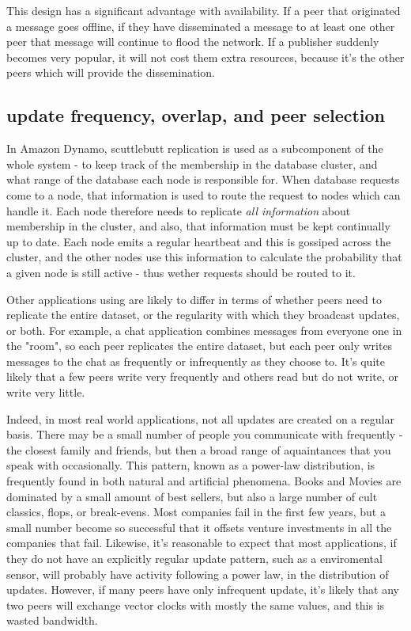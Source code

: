 \documentclass[sigconf]{acmart}
\begin{document}
This design has a significant advantage with availability.  If a peer
that originated a message goes offline, if they have disseminated a
message to at least one other peer that message will continue to flood
the network. If a publisher suddenly becomes very popular, it will not
cost them extra resources, because it's the other peers which will
provide the dissemination.

\subsection{update frequency, overlap, and peer selection}

In Amazon Dynamo, scuttlebutt replication is used as a subcomponent of
the whole system - to keep track of the membership in the database
cluster, and what range of the database each node is responsible
for. When database requests come to a node, that information is used
to route the request to nodes which can handle it. Each node therefore
needs to replicate {\em all information} about membership in the
cluster, and also, that information must be kept continually up to
date. Each node emits a regular heartbeat and this is gossiped across
the cluster, and the other nodes use this information to calculate the
probability that a given node is still active - thus wether requests
should be routed to it.

Other applications using are likely to differ in terms of whether
peers need to replicate the entire dataset, or the regularity with
which they broadcast updates, or both. For example, a chat application
combines messages from everyone one in the "room", so each peer
replicates the entire dataset, but each peer only writes messages to
the chat as frequently or infrequently as they choose to. It's quite
likely that a few peers write very frequently and others read but do
not write, or write very little.

Indeed, in most real world applications, not all updates are created
on a regular basis. There may be a small number of people you
communicate with frequently - the closest family and friends, but then
a broad range of aquaintances that you speak with occasionally. This
pattern, known as a power-law distribution, is frequently found in
both natural and artificial phenomena.  Books and Movies are dominated
by a small amount of best sellers, but also a large number of cult
classics, flops, or break-evens.  Most companies fail in the first few
years, but a small number become so successful that it offsets venture
investments in all the companies that fail. Likewise, it's reasonable
to expect that most applications, if they do not have an explicitly
regular update pattern, such as a enviromental sensor, will probably
have activity following a power law, in the distribution of
updates. However, if many peers have only infrequent update, it's
likely that any two peers will exchange vector clocks with mostly the
same values, and this is wasted bandwidth.
\end{document}
